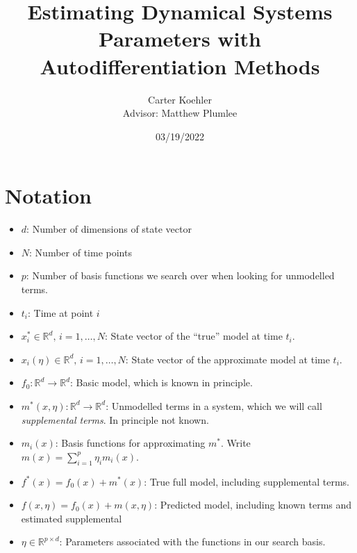 \documentclass[12pt]{article}
\author{Carter Koehler\\{\small Advisor: Matthew Plumlee}}
\title{Estimating Dynamical Systems Parameters with Autodifferentiation Methods}
\date{03/19/2022}
\begin{document}
\maketitle



\begin{abstract}
  
\end{abstract}


\section{Notation}

\begin{itemize}

\item
  $d$: Number of dimensions of state vector

\item
  $N$: Number of time points

\item
  $p$: Number of basis functions we search over when looking for unmodelled terms.

\item
  $t_i$: Time at point $i$
  
\item
  $x_i^* \in \mathbb{R}^d,\, i=1,\ldots, N$: State vector of the ``true'' model at time $t_i$. 

\item
  $x_i(\eta) \in \mathbb{R}^d,\, i=1,\ldots, N$: State vector of the approximate model at time $t_i$. 
  
\item
  $f_0: \mathbb{R}^d \to \mathbb{R}^d$: Basic model, which is known in principle.

\item
  $m^*(x, \eta): \mathbb{R}^d \to \mathbb{R}^d$: Unmodelled terms in a system, which we will call \textit{supplemental terms}. In principle not known.

\item
  $m_i(x)$: Basis functions for approximating $m^*$. Write $m(x) = \sum_{i=1}^{p} \eta_i m_i(x)$.

\item
  $f^*(x) = f_0(x) + m^*(x)$: True full model, including supplemental terms.

\item
  $f(x, \eta) = f_0(x) + m(x, \eta)$: Predicted model, including known terms and estimated supplemental  
  
\item
  $\eta \in \mathbb{R}^{p \times d}$: Parameters associated with the functions in our search basis.

\end{itemize}
\end{document}
